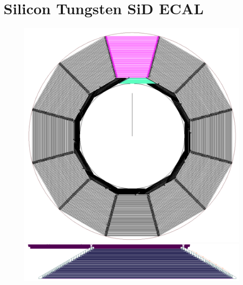\section{Silicon Tungsten SiD ECAL}
\begin{figure}
	\centering
	\begin{minipage}[b]{.49\textwidth}
		\includegraphics[width=\linewidth]{Calorimeter/SiliconTungstenSiD/cross_section}
		\caption{}
		\label{fig:Calorimeter:SiDECAL:crosssection}
	\end{minipage}\hfill
	\begin{minipage}[b]{.49\textwidth}
		\includegraphics[width=\linewidth]{Calorimeter/SiliconTungstenSiD/ecalModule}
		\caption{}
		\label{fig:Calorimeter:SiDECAL:ecalModule}
	\end{minipage}
\end{figure}
